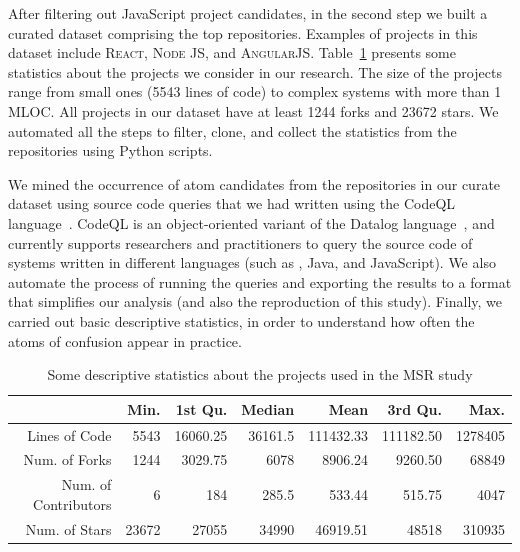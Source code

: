 After filtering out JavaScript project candidates, in the second step we built a curated dataset comprising the top \minedprojects repositories. Examples of projects in this dataset include \textsc{React}, \textsc{Node JS}, and \textsc{AngularJS}. Table~\ref{tab:projects-statistics} presents some statistics about the projects we consider in our research. The size of the projects range from small ones (5543 lines of code) to complex systems with more than 1 MLOC. All projects in our dataset have at least \num{1244} forks and \num{23672} stars. We automated all the steps to filter, clone, and collect the statistics from the repositories using Python scripts.

We mined the occurrence of atom candidates from the repositories in our curate dataset using source code queries that we had written using the CodeQL language~\cite{moor:gttse2007}. CodeQL is an object-oriented variant of the Datalog language~\cite{rodriguez2020efficient}, and currently supports researchers and practitioners to query the source code of systems written in different languages (such as \cpplang, Java, and JavaScript). We also automate the process of running the queries and exporting the results to a format that simplifies our
analysis (and also the reproduction of this study). Finally, we carried
out basic descriptive statistics, in order to understand how often the
atoms of confusion appear in practice. 

\begin{table}[ht]
 \centering
 \begin{tabular}{rrrrrrr}
   \hline
             & Min. & 1st Qu. & Median & Mean & 3rd Qu. & Max. \\ \hline
 Lines of Code           & \num{5543}  & \num{16060.25} & \num{36161.5} & \num{111432.33} & \num{111182.50} & \num{1278405} \\
 Num. of Forks     & \num{1244}   & \num{3029.75} & \num{6078} & \num{8906.24} & \num{9260.50} & \num{68849} \\
 Num. of Contributors  & \num{6}   & \num{184} & \num{285.5} & \num{533.44} & \num{515.75} & \num{4047} \\
 Num. of Stars        & \num{23672} & \num{27055} & \num{34990} & \num{46919.51} & \num{48518} & \num{310935} \\
 
    \hline
 \end{tabular}
 \caption{Some descriptive statistics about the projects used in the MSR study}
 \label{tab:projects-statistics} 
 \end{table}


